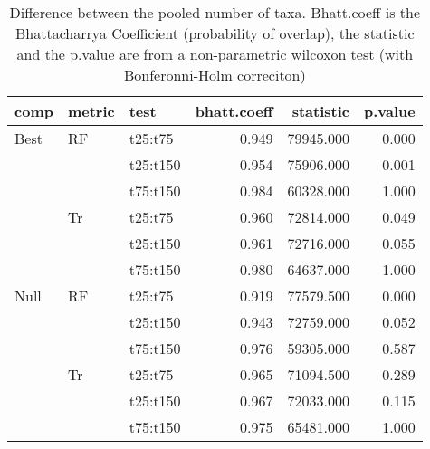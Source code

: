 \begin{table}[ht]
\centering
\begin{tabular}{lllrrr}
  \hline
comp & metric & test & bhatt.coeff & statistic & p.value \\ 
  \hline
Best & RF & t25:t75 & 0.949 & 79945.000 & 0.000 \\ 
   &  & t25:t150 & 0.954 & 75906.000 & 0.001 \\ 
   &  & t75:t150 & 0.984 & 60328.000 & 1.000 \\ 
   & Tr & t25:t75 & 0.960 & 72814.000 & 0.049 \\ 
   &  & t25:t150 & 0.961 & 72716.000 & 0.055 \\ 
   &  & t75:t150 & 0.980 & 64637.000 & 1.000 \\ 
  Null & RF & t25:t75 & 0.919 & 77579.500 & 0.000 \\ 
   &  & t25:t150 & 0.943 & 72759.000 & 0.052 \\ 
   &  & t75:t150 & 0.976 & 59305.000 & 0.587 \\ 
   & Tr & t25:t75 & 0.965 & 71094.500 & 0.289 \\ 
   &  & t25:t150 & 0.967 & 72033.000 & 0.115 \\ 
   &  & t75:t150 & 0.975 & 65481.000 & 1.000 \\ 
   \hline
\end{tabular}
\caption{Difference between the pooled number of taxa. Bhatt.coeff is the Bhattacharrya Coefficient (probability of overlap), the statistic and the p.value are from a non-parametric wilcoxon test (with Bonferonni-Holm correciton)} 
\label{Full_Tab_pooledstaxa_test}
\end{table}
